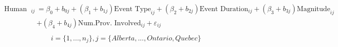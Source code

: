 \begin{align}
\begin{split}
\text{Human Cost}_{ij}&=\beta_0+b_{0j}+(\beta_{1}+b_{1j})\text{Event Type}_{ij}+(\beta_{2}+b_{2j})\text{Event Duration}_{ij}+(\beta_{3}+b_{3j})\text{Magnitude}_{ij}\\ &+(\beta_{4}+b_{4j})\text{Num.Prov. Involved}_{ij}+\varepsilon_{ij}\\
\end{split}
\label{human_province}
\end{align}
\begin{equation*}
i=\{1,...,n_j\},
j=\{Alberta,...,Ontario, Quebec\}
\end{equation*}
